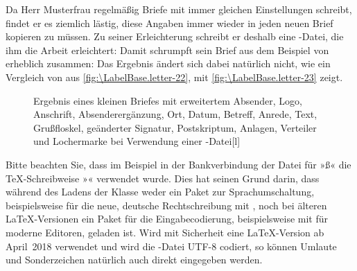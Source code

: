 \begin{Example}
  Da Herr Musterfrau regelmäßig Briefe mit immer gleichen Einstellungen
  schreibt, findet er es ziemlich lästig, diese Angaben immer wieder in jeden
  neuen Brief kopieren zu müssen. Zu seiner Erleichterung schreibt er deshalb
  eine -Datei, die ihm die Arbeit erleichtert:%
  Damit schrumpft sein Brief aus dem Beispiel von
   erheblich zusammen:
  Das Ergebnis ändert sich dabei natürlich nicht, wie ein Vergleich von aus
  \autoref{fig:\LabelBase.letter-22}, 
  mit \autoref{fig:\LabelBase.letter-23} zeigt.
  \begin{figure}
    \setcapindent{0pt}%
    \begin{captionbeside}{Ergebnis eines
        kleinen Briefes mit erweitertem Absender, Logo, Anschrift,
        Absenderergänzung, Ort, Datum, Betreff, Anrede, Text, Grußfloskel,
        geänderter Signatur, Postskriptum, Anlagen, Verteiler und Lochermarke
        bei Verwendung einer -Datei}[l]
    \end{captionbeside}
    \label{fig:\LabelBase.letter-23}
  \end{figure}
\end{Example}

Bitte beachten Sie, dass im Beispiel in der Bankverbindung
der Datei  für »ß« die \TeX-Schreibweise »« verwendet
wurde. Dies hat seinen Grund darin, dass während des Ladens der Klasse weder
ein Paket zur Sprachumschaltung, beispielsweise für die neue, deutsche
Rechtschreibung mit ,
noch bei älteren \LaTeX-Versionen ein Paket für die Eingabecodierung,
beispielsweise mit 
für moderne Editoren, geladen ist. Wird mit Sicherheit eine \LaTeX-Version ab
April~2018 verwendet und wird die -Datei UTF-8 codiert, so können
Umlaute und Sonderzeichen natürlich auch direkt eingegeben werden.

